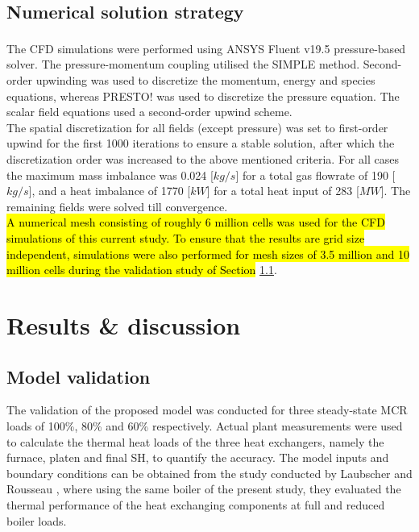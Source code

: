 \documentclass[twocolumn,10pt]{asme2ej}
\begin{document}
\subsection{Numerical solution strategy}\label{sec_num_sol}
The CFD simulations were performed using ANSYS Fluent v19.5\textsuperscript{\textregistered} pressure-based solver. The pressure-momentum coupling utilised the SIMPLE method. Second-order upwinding was used to discretize the momentum, energy and species equations, whereas PRESTO! was used to discretize the pressure equation. The scalar field equations used a second-order upwind scheme.\\

The spatial discretization for all fields (except pressure) was set to first-order upwind for the first 1000 iterations to ensure a stable solution, after which the discretization order was increased to the above mentioned criteria. For all cases the maximum mass imbalance was 0.024 [$kg/s$] for a total gas flowrate of 190 [$kg/s$], and a heat imbalance of 1770 [$kW$] for a total heat input of 283 [$MW$]. The remaining fields were solved till convergence.\\

\hl{A numerical mesh consisting of roughly 6 million cells was used for the CFD simulations of this current study. To ensure that the results are grid size independent, simulations were also performed for mesh sizes of 3.5 million and 10 million cells during the validation study of Section} \ref{sec_model_valid}.

\section{Results \& discussion}
\subsection{Model validation}\label{sec_model_valid}
The validation of the proposed model was conducted for three steady-state MCR loads of 100\%, 80\% and 60\% respectively. Actual plant measurements were used to calculate the thermal heat loads of the three heat exchangers, namely the furnace, platen and final SH, to quantify the accuracy. The model inputs and boundary conditions can be obtained from the study conducted by Laubscher and Rousseau \cite{Laubscher2019b}, where using the same boiler of the present study, they evaluated the thermal performance of the heat exchanging components at full and reduced boiler loads.\\
\end{document}
